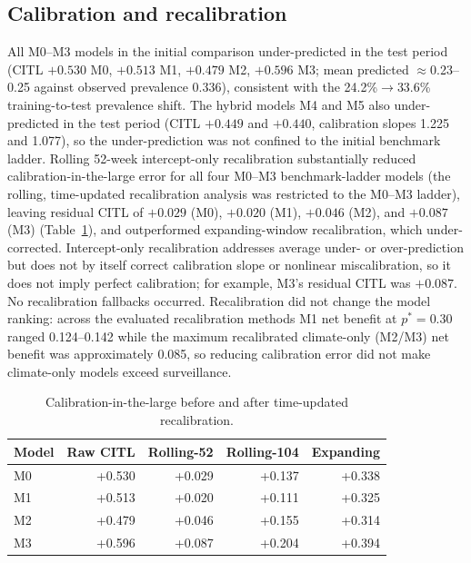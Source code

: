 \documentclass[11pt,a4paper]{article}
\begin{document}
\subsection{Calibration and recalibration}
All M0--M3 models in the initial comparison under-predicted in the test period (CITL $+0.530$ M0, $+0.513$ M1, $+0.479$ M2, $+0.596$ M3; mean predicted $\approx$0.23--0.25 against observed prevalence 0.336), consistent with the 24.2\%$\rightarrow$33.6\% training-to-test prevalence shift. The hybrid models M4 and M5 also under-predicted in the test period (CITL $+0.449$ and $+0.440$, calibration slopes 1.225 and 1.077), so the under-prediction was not confined to the initial benchmark ladder. Rolling 52-week intercept-only recalibration substantially reduced calibration-in-the-large error for all four M0--M3 benchmark-ladder models (the rolling, time-updated recalibration analysis was restricted to the M0--M3 ladder), leaving residual CITL of $+0.029$ (M0), $+0.020$ (M1), $+0.046$ (M2), and $+0.087$ (M3) (Table~\ref{tab:recal}), and outperformed expanding-window recalibration, which under-corrected. Intercept-only recalibration addresses average under- or over-prediction but does not by itself correct calibration slope or nonlinear miscalibration, so it does not imply perfect calibration; for example, M3's residual CITL was $+0.087$. No recalibration fallbacks occurred. Recalibration did not change the model ranking: across the evaluated recalibration methods M1 net benefit at $p^*=0.30$ ranged 0.124--0.142 while the maximum recalibrated climate-only (M2/M3) net benefit was approximately 0.085, so reducing calibration error did not make climate-only models exceed surveillance.

\begin{table}[htbp]
\centering
\caption{Calibration-in-the-large before and after time-updated recalibration.}
\label{tab:recal}
\small
\begin{tabular}{lrrrr}
\toprule
Model & Raw CITL & Rolling-52 & Rolling-104 & Expanding \\
\midrule
M0 & +0.530 & +0.029 & +0.137 & +0.338 \\
M1 & +0.513 & +0.020 & +0.111 & +0.325 \\
M2 & +0.479 & +0.046 & +0.155 & +0.314 \\
M3 & +0.596 & +0.087 & +0.204 & +0.394 \\
\bottomrule
\end{tabular}
\end{table}
\end{document}
